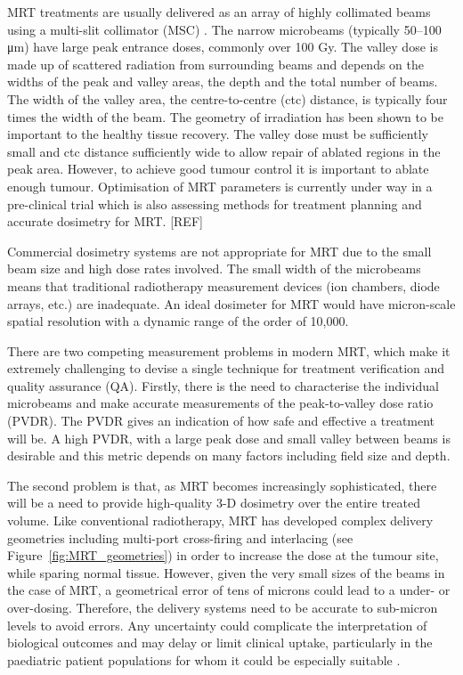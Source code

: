 	
	MRT treatments are usually delivered as an array of highly collimated beams using a multi-slit collimator (MSC) \cite{brauer2005characterization}. The narrow microbeams (typically 50--100 \si{\um}) have large peak entrance doses, commonly over 100 Gy.
	The valley dose is made up of scattered radiation from surrounding beams and depends on the widths of the peak and valley areas, the depth and the total number of beams. The width of the valley area, the centre-to-centre (ctc) distance, is typically four times the width of the beam. 
	The geometry of irradiation has been shown to be important to the healthy tissue recovery. The valley dose must be sufficiently small and ctc distance sufficiently wide to allow repair of ablated regions in the peak area. However, to achieve good tumour control it is important to ablate enough tumour. Optimisation of MRT parameters is currently under way in a pre-clinical trial which is also assessing methods for treatment planning and accurate dosimetry for MRT. [REF]
	
	
	
	Commercial dosimetry systems are not appropriate for MRT due to the small beam size and high dose rates involved.	The small width of the microbeams means that traditional radiotherapy measurement devices (ion chambers, diode arrays, etc.) are inadequate. An ideal dosimeter for MRT would have micron-scale spatial resolution with a dynamic range of the order of 10,000.

    There are two competing measurement problems in modern MRT, which make it extremely challenging to devise a single technique for treatment verification and quality assurance (QA). Firstly, there is the need to characterise the individual microbeams and make accurate measurements of the peak-to-valley dose ratio (PVDR). The PVDR gives an indication of how safe and effective a treatment will be. A high PVDR, with a large peak dose and small valley between beams is desirable and this metric	depends on many factors including field size and depth. 

	The second problem is that, as MRT becomes increasingly sophisticated, there will be a need to provide high-quality 3-D dosimetry over the entire treated volume. Like conventional radiotherapy, MRT has developed complex delivery geometries including multi-port cross-firing \cite{brauer-krischnew2005} and interlacing \cite{brauer2013preclinical, serduc2009first,serduchigh-precision2010} (see Figure~\ref{fig:MRT_geometries}) in order to increase the dose at the tumour site, while sparing normal tissue. However, given the very small sizes of the beams in the case of MRT, a geometrical error of tens of microns could lead to a under- or over-dosing. Therefore, the delivery systems need to be accurate to sub-micron levels to avoid errors. %
	Any uncertainty could complicate the interpretation of biological outcomes and may delay or limit clinical uptake, particularly in the paediatric patient populations for whom it could be especially suitable \cite{laissue2001weanling}.
		
